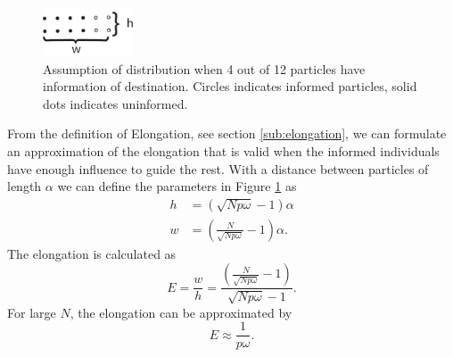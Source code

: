 \begin{figure}[H]
	\centering
	\includegraphics[width=0.24\textwidth]{img/heightwidth.pdf}
	\caption{Assumption of distribution when 4 out of 12 particles have information of destination. Circles indicates informed particles, solid dots indicates uninformed.}
	\label{fig:distr_direction}
\end{figure}
From the definition of Elongation, see section \ref{sub:elongation}, we can formulate an approximation of the elongation that is valid when the informed individuals have enough influence to guide the rest. With a distance between particles of length $\alpha$ we can define the parameters in Figure \ref{fig:distr_direction} as
\begin{align}
	h &= (\sqrt{Np\omega}-1)\alpha \\
	w & = (\frac{N}{\sqrt{Np\omega}} -1) \alpha.
\end{align}
The elongation is calculated as 
\begin{equation}
	E = \frac{w}{h} = \frac{(\frac{N}{\sqrt{Np\omega}} -1)}{\sqrt{Np\omega}-1}.
\end{equation}
For large $N$, the elongation can be approximated by
\begin{equation}
	E \approx \frac{1}{p\omega}.
\end{equation}